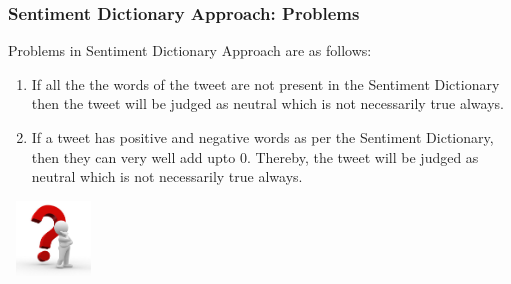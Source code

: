 \documentclass[12pt,xcolor=dvipsnames,table,titlepage]{beamer}
\begin{document}
\begin{frame}[t]
\frametitle{Sentiment Dictionary Approach: Problems}
Problems in Sentiment Dictionary Approach are as follows:
\begin{enumerate}
\item If all the the words of the tweet are not present in the Sentiment Dictionary then the tweet will be judged as neutral which is not necessarily true always.
\item If a tweet has positive and negative words as per the Sentiment Dictionary, then they can very well add upto 0. Thereby, the tweet will be judged as neutral which is not necessarily true always.
\end{enumerate}
\begin{center}
\includegraphics[width=90, height=75]{img3.jpg} 
\end{center}
\end{frame}
\end{document}
